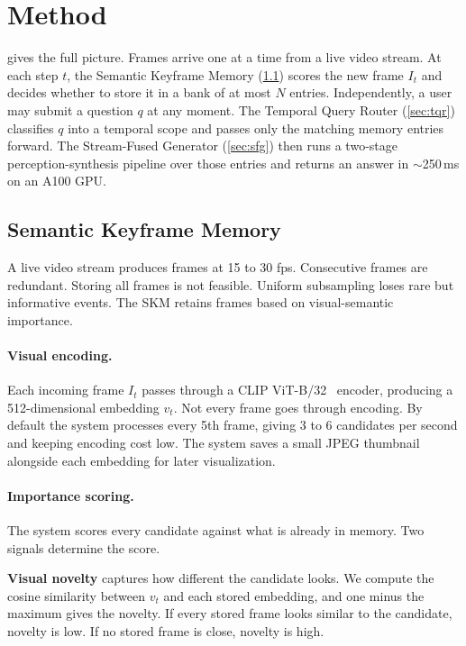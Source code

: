 \section{Method}
\label{sec:method}

 gives the full picture.
Frames arrive one at a time from a live video stream. At each step $t$, the Semantic Keyframe Memory (\cref{sec:skm}) scores the new frame $I_t$ and decides whether to store it in a bank of at most $N$ entries.
Independently, a user may submit a question $q$ at any moment.
The Temporal Query Router (\cref{sec:tqr}) classifies $q$ into a temporal scope and passes only the matching memory entries forward.
The Stream-Fused Generator (\cref{sec:sfg}) then runs a two-stage perception-synthesis pipeline over those entries and returns an answer in $\sim$250\,ms on an A100 GPU.

\subsection{Semantic Keyframe Memory}
\label{sec:skm}

A live video stream produces frames at 15 to 30 fps. Consecutive frames are redundant.
Storing all frames is not feasible. Uniform subsampling loses rare but informative events.
The SKM retains frames based on visual-semantic importance.

\paragraph{Visual encoding.}
Each incoming frame $I_t$ passes through a CLIP ViT-B/32~\cite{radford2021clip} encoder, producing a 512-dimensional embedding $v_t$.
Not every frame goes through encoding. By default the system processes every 5th frame, giving 3 to 6 candidates per second and keeping encoding cost low.
The system saves a small JPEG thumbnail alongside each embedding for later visualization.

\paragraph{Importance scoring.}
The system scores every candidate against what is already in memory. Two signals determine the score.

\textbf{Visual novelty} captures how different the candidate looks. We compute the cosine similarity between $v_t$ and each stored embedding, and one minus the maximum gives the novelty. If every stored frame looks similar to the candidate, novelty is low. If no stored frame is close, novelty is high.

